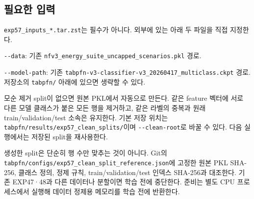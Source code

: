 \subsection{필요한 입력}
\texttt{exp57\_\allowbreak{}\allowbreak{}in\allowbreak{}puts\_\allowbreak{}\allowbreak{}*.\allowbreak{}t\allowbreak{}ar.\allowbreak{}zst}는 필수가 아니다. 외부에 있는 아래 두 파일을 직접 지정한다.

\par\noindent \textbullet\enspace \texttt{-\allowbreak{}-\allowbreak{}data}: 기존 \texttt{nfv3\_\allowbreak{}\allowbreak{}ene\allowbreak{}rgy\_\allowbreak{}\allowbreak{}suit\allowbreak{}e\_\allowbreak{}\allowbreak{}uncapp\allowbreak{}ed\_\allowbreak{}\allowbreak{}scena\allowbreak{}rios.\allowbreak{}pkl\allowbreak{}} 경로.


\par\noindent \textbullet\enspace \texttt{-\allowbreak{}-\allowbreak{}model-\allowbreak{}path}: 기존 \texttt{tabpfn-\allowbreak{}v\allowbreak{}3-\allowbreak{}classi\allowbreak{}fier-\allowbreak{}v3\_\allowbreak{}\allowbreak{}20260417\allowbreak{}\_\allowbreak{}\allowbreak{}multicl\allowbreak{}ass.\allowbreak{}ckpt\allowbreak{}} 경로. 저장소의 \texttt{tabpfn/\allowbreak{}\allowbreak{}} 아래에 있으면 생략할 수 있다.


모순 제거 split이 없으면 원본 PKL에서 자동으로 만든다. 같은 feature 벡터에 서로 다른 모델 클래스가 붙은 모든 행을 제거하고, 같은 라벨의 중복과 원래 train/\allowbreak{}validation/\allowbreak{}test 소속은 유지한다. 기본 저장 위치는 \texttt{tabpfn/\allowbreak{}\allowbreak{}r\allowbreak{}esults/\allowbreak{}\allowbreak{}e\allowbreak{}xp57\_\allowbreak{}\allowbreak{}cle\allowbreak{}an\_\allowbreak{}\allowbreak{}split\allowbreak{}s/\allowbreak{}\allowbreak{}}이며 \texttt{-\allowbreak{}-\allowbreak{}clean-\allowbreak{}root}로 바꿀 수 있다. 다음 실행에서는 저장된 split을 재사용한다.

생성한 split은 단순히 행 수만 맞추는 것이 아니다. Git의 \texttt{tabpfn/\allowbreak{}\allowbreak{}c\allowbreak{}onfigs/\allowbreak{}\allowbreak{}e\allowbreak{}xp57\_\allowbreak{}\allowbreak{}cle\allowbreak{}an\_\allowbreak{}\allowbreak{}split\allowbreak{}\_\allowbreak{}\allowbreak{}referen\allowbreak{}ce.\allowbreak{}json}에 고정한 원본 PKL SHA-256, 클래스 정의, 정제 규칙, train/\allowbreak{}validation/\allowbreak{}test 인덱스 SHA-256과 대조한다. 기존 EXP47·48과 다른 데이터나 분할이면 학습 전에 중단한다. 준비는 별도 CPU 프로세스에서 실행해 데이터 정제용 메모리를 학습 전에 반환한다.

